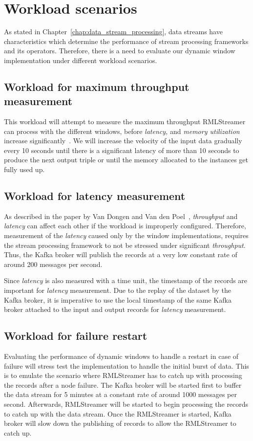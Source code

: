 \section{Workload scenarios}
As stated in Chapter~\ref{chap:data_stream_processing}, data streams have characteristics 
which determine the performance of stream processing frameworks and its operators. Therefore, 
there is a need to evaluate our dynamic window implementation under different workload scenarios. 

\subsection{Workload for maximum throughput measurement}
This workload will attempt to measure the maximum throughput RMLStreamer can 
process with the different windows, before \emph{latency,} and \emph{memory utilization}
increase significantly~\cite{benchmark_dsdps}. We will increase the velocity of the input data gradually 
every 10 seconds until there is a significant latency of more than 10 seconds to produce
the next output triple or until the memory allocated to the instances get fully used up. 


\subsection{Workload for latency measurement}
As described in the paper by Van Dongen and Van den Poel~\cite{evalution_of_spe}, 
\emph{throughput} and \emph{latency} can affect each other if the workload is 
improperly configured. Therefore, measurement of the \emph{latency} caused only 
by the window implementations, requires the stream processing framework to not be 
stressed under significant \emph{throughput}. Thus, the Kafka broker will 
publish the records at a very low constant rate of around 200 messages per second. 

Since \emph{latency} is also measured with a time unit, the timestamp of the 
records are important for \emph{latency} measurement. Due to the replay of the dataset 
by the Kafka broker, it is imperative to use the local timestamp of the same Kafka broker
attached to the input and output records for \emph{latency} 
measurement\cite{latency_measurement_kafka}.

\subsection{Workload for failure restart}
Evaluating the performance of dynamic windows to handle a restart in case of failure  
will stress test the implementation to handle the initial burst of data.
This is to emulate the scenario where RMLStreamer has to catch up with processing 
the records after a node failure. The Kafka 
broker will be started first to buffer the data stream for 5 minutes at a constant rate 
of around 1000 messages per second. Afterwards, RMLStreamer will be started to begin 
processing the records to catch up with the data stream. Once the RMLStreamer is started, 
Kafka broker will slow down the publishing of records to allow the RMLStreamer to catch
up.

